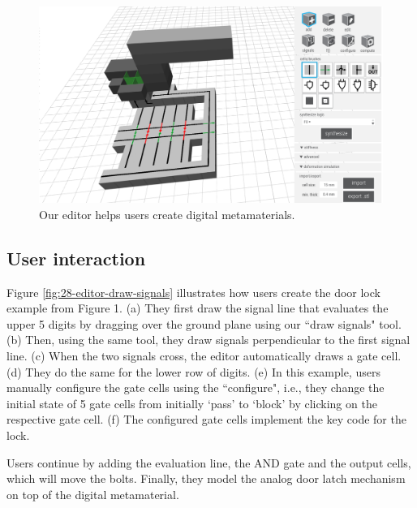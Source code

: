 \begin{figure} [h]
    \includegraphics[width=\textwidth]{chapters/digital-metamaterials-FIG/27-editor-interface.pdf}
    \caption[Short figure name.]{Our editor helps users create digital metamaterials.
    \label{fig:27-editor-interface}}
\end{figure}

\subsection{User interaction}
Figure \ref{fig:28-editor-draw-signals} illustrates how users create the door lock example from Figure 1. (a) They first draw the signal line that evaluates the upper 5 digits by dragging over the ground plane using our ``draw signals" tool. (b) Then, using the same tool, they draw signals perpendicular to the first signal line. (c) When the two signals cross, the editor automatically draws a gate cell. (d) They do the same for the lower row of digits. (e) In this example, users manually configure the gate cells using the ``configure", i.e., they change the initial state of 5 gate cells from initially `pass' to `block' by clicking on the respective gate cell. (f) The configured gate cells implement the key code for the lock. 

Users continue by adding the evaluation line, the AND gate and the output cells, which will move the bolts. Finally, they model the analog door latch mechanism on top of the digital metamaterial. 

